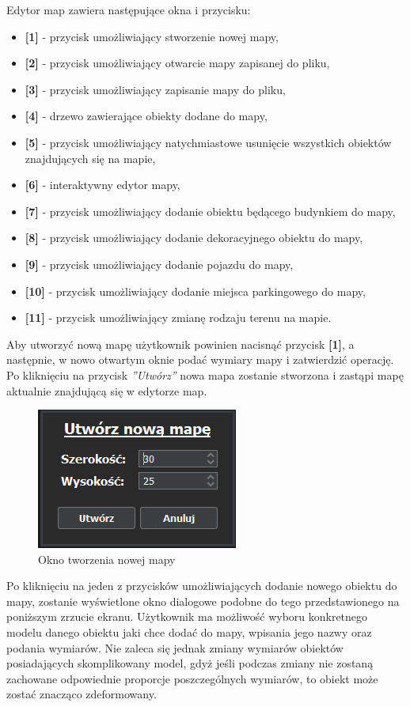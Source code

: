 \documentclass[a4paper,11pt,twoside]{report}
\theoremstyle{definition}
\begin{document}
Edytor map zawiera następujące okna i przycisku:
\begin{itemize}
	\item \textbf{[1]} - przycisk umożliwiający stworzenie nowej mapy,
	\item \textbf{[2]} - przycisk umożliwiający otwarcie mapy zapisanej do pliku,
	\item \textbf{[3]} - przycisk umożliwiający zapisanie mapy do pliku,
	\item \textbf{[4]} - drzewo zawierające obiekty dodane do mapy,
	\item \textbf{[5]} - przycisk umożliwiający natychmiastowe usunięcie wszystkich obiektów znajdujących się na mapie,
	\item \textbf{[6]} - interaktywny edytor mapy,
	\item \textbf{[7]} - przycisk umożliwiający dodanie obiektu będącego budynkiem do mapy,
	\item \textbf{[8]} - przycisk umożliwiający dodanie dekoracyjnego obiektu do mapy,
	\item \textbf{[9]} - przycisk umożliwiający dodanie pojazdu do mapy,
	\item \textbf{[10]} - przycisk umożliwiający dodanie miejsca parkingowego do mapy,
	\item \textbf{[11]} - przycisk umożliwiający zmianę rodzaju terenu na mapie.
\end{itemize}

Aby utworzyć nową mapę użytkownik powinien nacisnąć przycisk \textbf{[1]}, a następnie, w nowo otwartym oknie podać wymiary mapy i zatwierdzić operację. Po kliknięciu na przycisk \textit{''Utwórz''} nowa mapa zostanie stworzona i zastąpi mapę aktualnie znajdującą się w edytorze map.

\begin{figure}[h!]
\centering
\includegraphics[scale=1.0]{instructionCreateMap}
\caption[Okno tworzenia nowej mapy]{Okno tworzenia nowej mapy}
\end{figure}

Po kliknięciu na jeden z przycisków umożliwiających dodanie nowego obiektu do mapy, zostanie wyświetlone okno dialogowe podobne do tego przedstawionego na poniższym zrzucie ekranu. Użytkownik ma możliwość wyboru konkretnego modelu danego obiektu jaki chce dodać do mapy, wpisania jego nazwy oraz podania wymiarów. Nie zaleca się jednak zmiany wymiarów obiektów posiadających skomplikowany model, gdyż jeśli podczas zmiany nie zostaną zachowane odpowiednie proporcje poszczególnych wymiarów, to obiekt może zostać znacząco zdeformowany.
\end{document}
